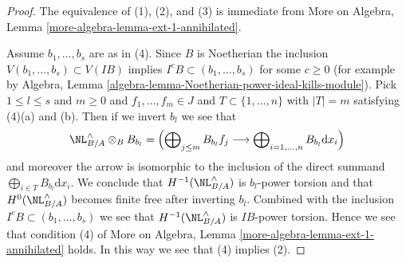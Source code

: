 \begin{proof}
The equivalence of (1), (2), and (3) is immediate from
More on Algebra, Lemma \ref{more-algebra-lemma-ext-1-annihilated}.

\medskip\noindent
Assume $b_1, \ldots, b_s$ are as in (4). Since $B$ is Noetherian the inclusion
$V(b_1, \ldots, b_s) \subset V(IB)$ implies $I^cB \subset (b_1, \ldots, b_s)$
for some $c \geq 0$ (for example by
Algebra, Lemma \ref{algebra-lemma-Noetherian-power-ideal-kills-module}).
Pick $1 \leq l \leq s$ and $m \geq 0$ and $f_1, \ldots, f_m \in J$
and $T \subset \{1, \ldots, n\}$ with $|T| = m$ satisfying (4)(a) and (b).
Then if we invert $b_l$ we see that
$$
\NL_{B/A}^\wedge \otimes_B B_{b_l} =
\left(
\bigoplus\nolimits_{j \leq m} B_{b_l} f_j
\longrightarrow
\bigoplus\nolimits_{i = 1, \ldots, n} B_{b_l} \text{d}x_i
\right)
$$
and moreover the arrow is isomorphic to the inclusion of the direct
summand $\bigoplus_{i \in T} B_{b_l} \text{d}x_i$. We conclude that
$H^{-1}(\NL_{B/A}^\wedge)$ is $b_l$-power torsion and that
$H^0(\NL_{B/A}^\wedge)$ becomes finite free after inverting $b_l$.
Combined with the inclusion $I^cB \subset (b_1, \ldots, b_s)$
we see that $H^{-1}(\NL_{B/A}^\wedge)$ is $IB$-power torsion.
Hence we see that condition (4) of
More on Algebra, Lemma \ref{more-algebra-lemma-ext-1-annihilated}
holds. In this way we see that (4) implies (2).


\end{proof}
